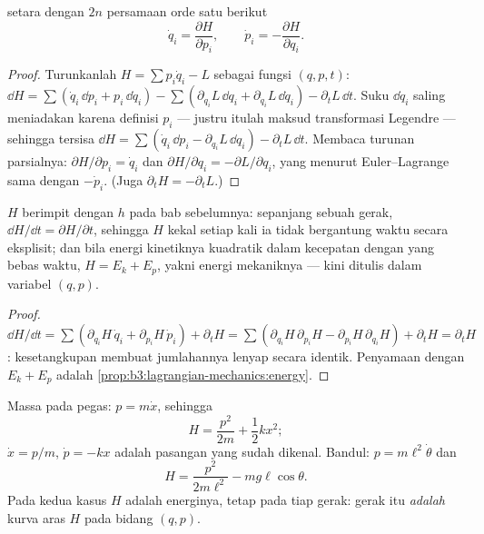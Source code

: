 \begin{theorem}\label{thm:b3:hamiltonian-mechanics:canonical}
 setara dengan $2n$ persamaan orde satu
berikut
\[
\dot q_i = \frac{\partial H}{\partial p_i} , \qquad
\dot p_i = -\frac{\partial H}{\partial q_i} .
\]
\end{theorem}

\begin{proof}
Turunkanlah $H = \sum p_i\dot q_i - L$ sebagai fungsi $(q, p, t)$:
$\dd H = \sum(\dot q_i\,\dd p_i + p_i\,\dd\dot q_i) - \sum(
\partial_{q_i}L\,\dd q_i + \partial_{\dot q_i}L\,\dd\dot q_i) -
\partial_tL\,\dd t$. Suku $\dd\dot q_i$ saling meniadakan karena
definisi $p_i$ --- justru itulah maksud transformasi Legendre ---
sehingga tersisa
$\dd H = \sum(\dot q_i\,\dd p_i - \partial_{q_i}L\,\dd q_i) -
\partial_tL\,\dd t$. Membaca turunan parsialnya:
$\partial H/\partial p_i = \dot q_i$ dan $\partial H/\partial q_i =
-\partial L/\partial q_i$, yang menurut Euler--Lagrange sama dengan $-\dot p_i$.
(Juga $\partial_tH = -\partial_tL$.)
\end{proof}

\begin{proposition}\label{prop:b3:hamiltonian-mechanics:energy}
$H$ berimpit dengan  $h$ pada bab sebelumnya: sepanjang
sebuah gerak, $\dd H/\dd t = \partial H/\partial t$, sehingga $H$ kekal
setiap kali ia tidak bergantung waktu secara eksplisit; dan bila energi
kinetiknya kuadratik dalam kecepatan dengan  yang bebas waktu,
$H = E_k + E_p$, yakni energi mekaniknya --- kini ditulis dalam
variabel $(q, p)$.
\end{proposition}

\begin{proof}
$\dd H/\dd t = \sum(\partial_{q_i}H\,\dot q_i + \partial_{p_i}H\,\dot
p_i) + \partial_tH = \sum(\partial_{q_i}H\,\partial_{p_i}H -
\partial_{p_i}H\,\partial_{q_i}H) + \partial_tH = \partial_tH$:
kesetangkupan  membuat jumlahannya lenyap secara
identik. Penyamaan dengan $E_k + E_p$ adalah
\cref{prop:b3:lagrangian-mechanics:energy}.
\end{proof}

\begin{example}\label{ex:b3:hamiltonian-mechanics:examples}
Massa pada pegas: $p = m\dot x$, sehingga
\[
H = \frac{p^2}{2m} + \frac12 kx^2 ;
\]
 $\dot x = p/m$, $\dot p = -kx$ adalah pasangan yang
sudah dikenal. Bandul: $p = m\ell^2\dot\theta$ dan
\[
H = \frac{p^2}{2m\ell^2} - mg\ell\cos\theta .
\]
Pada kedua kasus $H$ adalah energinya, tetap pada tiap gerak: gerak itu
\emph{adalah} kurva aras $H$ pada bidang $(q,p)$.
\end{example}


